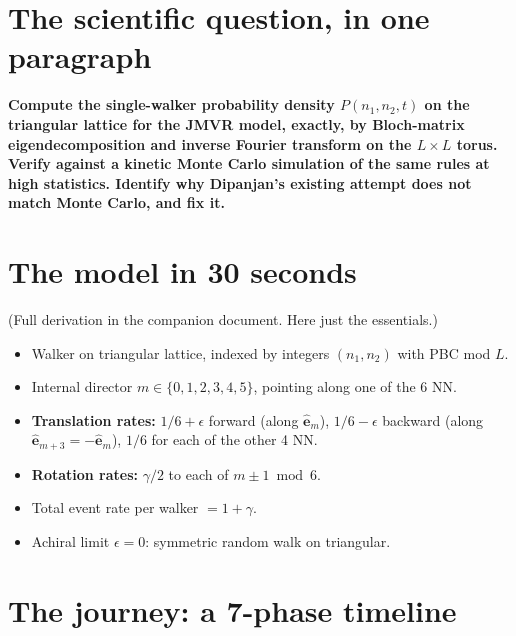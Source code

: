 \documentclass[11pt,a4paper]{article}
\newcommand{\veps}[1]{\hat{\mathbf{e}}_{#1}}
\begin{document}
\section{The scientific question, in one paragraph}\label{sec:question}

\noindent\textbf{Compute the single-walker probability density
$P(n_1, n_2, t)$ on the triangular lattice for the JMVR model, exactly,
by Bloch-matrix eigendecomposition and inverse Fourier transform on the
$L\times L$ torus. Verify against a kinetic Monte Carlo simulation of
the same rules at high statistics. Identify why Dipanjan's existing
attempt does not match Monte Carlo, and fix it.}

\section{The model in 30 seconds}\label{sec:model-recap}

(Full derivation in the companion document. Here just the essentials.)

\begin{itemize}[leftmargin=*]
\item Walker on triangular lattice, indexed by integers $(n_1, n_2)$
  with PBC mod $L$.
\item Internal director $m \in \{0, 1, 2, 3, 4, 5\}$, pointing along
  one of the 6 NN.
\item \textbf{Translation rates:} $1/6 + \epsilon$ forward (along $\veps{m}$),
  $1/6 - \epsilon$ backward (along $\veps{m+3} = -\veps{m}$),
  $1/6$ for each of the other 4 NN.
\item \textbf{Rotation rates:} $\gamma/2$ to each of $m \pm 1 \bmod 6$.
\item Total event rate per walker $= 1 + \gamma$.
\item Achiral limit $\epsilon = 0$: symmetric random walk on triangular.
\end{itemize}

\section{The journey: a 7-phase timeline}\label{sec:journey}
\end{document}
